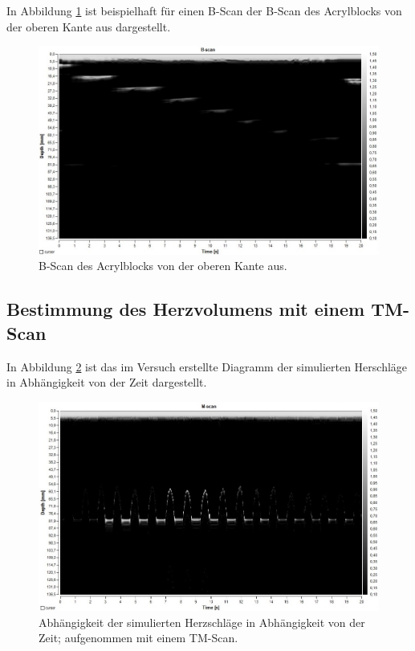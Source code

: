 In Abbildung \ref{fig:b-scan} ist beispielhaft für einen B-Scan der B-Scan des
Acrylblocks von der oberen Kante aus dargestellt.
\begin{figure}[H]
  \centering
  \includegraphics[width=15cm]{data/Bscanrechtsnachlinkswieinzeichnung.jpg}
  \caption{B-Scan des Acrylblocks von der oberen Kante aus.}
  \label{fig:b-scan}
\end{figure}

\newpage
\subsection{Bestimmung des Herzvolumens mit einem TM-Scan}
\label{subsec:Herzvolumen}


In Abbildung \ref{fig:herzvolumen} ist das im Versuch erstellte Diagramm der
simulierten Herschläge in Abhängigkeit von der Zeit dargestellt.

\begin{figure}[H]
  \centering
  \includegraphics[width=15cm]{data/Herzfrequenz.jpg}
  \caption{Abhängigkeit der simulierten Herzschläge in Abhängigkeit von der Zeit; aufgenommen
  mit einem TM-Scan.}
  \label{fig:herzvolumen}
\end{figure}

